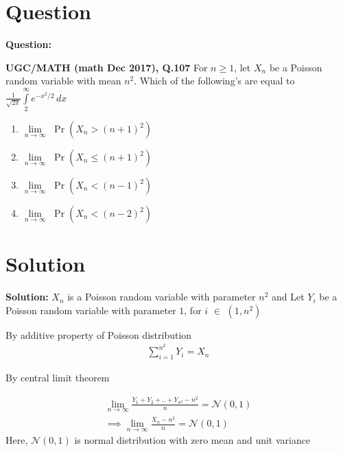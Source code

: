 \documentclass{beamer}
\providecommand{\pr}[1]{\ensuremath{\Pr\left(#1\right)}}
\providecommand{\brak}[1]{\ensuremath{\left(#1\right)}}
\begin{document}
\section{Question}
\begin{frame}{\textbf{Question:}}
    \begin{block}{\textbf{UGC/MATH (math Dec 2017), Q.107}}
    For $n \geq 1$, let $X_n$ be a Poisson random  variable with mean $n^2$.
 Which of the following's are equal to
 $\displaystyle{\frac{1}{\sqrt{2\pi}} \int \limits_2^{\infty} e^{-x^2/2}\,dx}$
 \begin{enumerate}
    \item $\lim \limits_{n \to \infty} $ \pr{X_n > (n+1)^2}
    \item $\lim \limits_{n \to \infty} $ \pr{X_n \leqslant (n+1)^2}
    \item $\lim \limits_{n \to \infty} $ \pr{X_n<(n-1)^2}
    \item $\lim \limits_{n \to \infty} $ \pr{X_n<(n-2)^2}
\end{enumerate}
    \end{block}
\end{frame}

\section{Solution}
\begin{frame}{\textbf{Solution:}}
    $X_n$ is a Poisson random variable with parameter $n^2$ and 
    Let $Y_i$ be a Poisson random variable with parameter $1$, for $i$ $\in$ $\brak{1,n^2}$
\begin{block}{
By additive property of Poisson distribution}
\begin{align}
   { \sum \limits_{i=1}^{n^2} Y_i = X_n   }  
\end{align}
\end{block}
\begin{block}{
By central limit theorem }

\begin{align}
    \lim  \limits_{n \to \infty} \frac{Y_1+Y_2+..+Y_{n^2} - n^2}{n} = \mathcal{N}(0,1)
    \\ \implies \lim  \limits_{n\to \infty} \frac{X_n-n^2}{n} = \mathcal{N}\brak{0,1}
\end{align}
Here, $\mathcal{N}\brak{0,1}$ is normal distribution with zero mean and unit variance
\end{block}
\end{frame}
\end{document}
